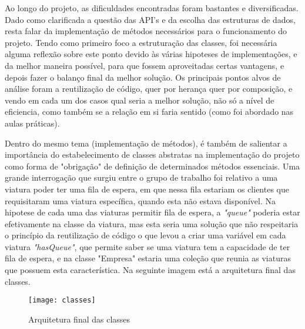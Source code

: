 \documentclass[a4paper]{article}
\begin{document}
\hspace{3mm} Ao longo do projeto, as dificuldades encontradas foram bastantes e diversificadas.
Dado como clarificada a questão das API's e da escolha das estruturas de dados, resta falar da implementação de métodos necessários para o funcionamento do projeto. Tendo como primeiro foco a estruturação das classes, foi necessária alguma reflexão sobre este ponto devido às várias hipoteses de implementações, e da melhor maneira possível, para  que fossem aproveitadas certas vantagens, e depois fazer o balanço final da melhor solução. Os principais pontos alvos de análise foram a reutilização de código, quer por herança quer por composição, e vendo em cada um dos casos qual seria a melhor solução, não só a nível de eficiencia, como também se a relação em si faria sentido (como foi abordado nas aulas práticas).
\par Dentro do mesmo tema (implementação de métodos), é também de salientar a importância do estabelecimento de classes abstratas na implementação do projeto como forma de "obrigação" de definição de determinados métodos essenciais. Uma grande interrogação que surgiu entre o grupo de trabalho foi relativo a uma viatura poder ter uma fila de espera, em que nessa fila estariam os clientes que requisitaram uma viatura específica, quando esta não estava disponível. Na hipotese de cada uma das viaturas permitir fila de espera, a \emph{"queue"} poderia estar efetivamente na classe da viatura, mas esta seria uma solução que não respeitaria o princípio da reutilização de código o que levou a criar uma variável em cada viatura \emph{"hasQueue"}, que permite saber se uma viatura tem a capacidade de ter fila de espera, e na classe "Empresa" estaria uma coleção que reunia as viaturas que possuem esta característica. Na seguinte imagem está a arquitetura final das classes.

\begin{figure}[htp]
\centering
\texttt{[image: classes]}
\caption{Arquitetura final das classes}
\label{fig:classes}
\end{figure}
\end{document}
